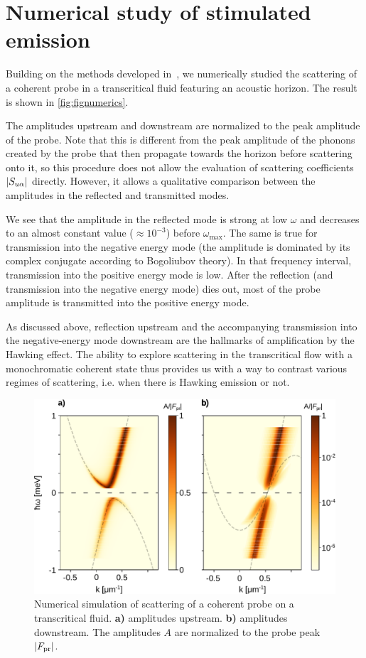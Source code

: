 \section{Numerical study of stimulated emission}
Building on the methods developed in~\cite{jacquet_quantum_2023}, we numerically studied the scattering of a coherent probe in a transcritical fluid featuring an acoustic horizon.
The result is shown in \autoref{fig:fignumerics}.

The amplitudes upstream and downstream are normalized to the peak amplitude of the probe.
Note that this is different from the peak amplitude of the phonons created by the probe that then propagate towards the horizon before scattering onto it, so this procedure does not allow the evaluation of scattering coefficients $\abs{S_{u\alpha}}$ directly.
However, it allows a qualitative comparison between the amplitudes in the reflected and transmitted modes.

We see that the amplitude in the reflected mode is strong at low $\omega$ and decreases to an almost constant value ($\approx 10^{-3}$) before $\omega_\mathrm{max}$.
The same is true for transmission into the negative energy mode (the amplitude is dominated by its complex conjugate according to Bogoliubov theory).
In that frequency interval, transmission into the positive energy mode is low.
After the reflection (and transmission into the negative energy mode) dies out, most of the probe amplitude is transmitted into the positive energy mode.

As discussed above, reflection upstream and the accompanying transmission into the negative-energy mode downstream are the hallmarks of amplification by the Hawking effect.
The ability to explore scattering in the transcritical flow with a monochromatic coherent state thus provides us with a way to contrast various regimes of scattering, i.e. when there is Hawking emission or not.

\begin{figure}
    \centering
    \includegraphics[width=0.75\linewidth]{chap_AG_theory/fig/fignumerics.pdf}
    \caption{Numerical simulation of scattering of a coherent probe on a transcritical fluid. \textbf{a)} amplitudes upstream. \textbf{b)} amplitudes downstream. The amplitudes $A$ are normalized to the probe peak $\abs{F_\mathrm{pr}}$.}
    \label{fig:fignumerics}
\end{figure}

